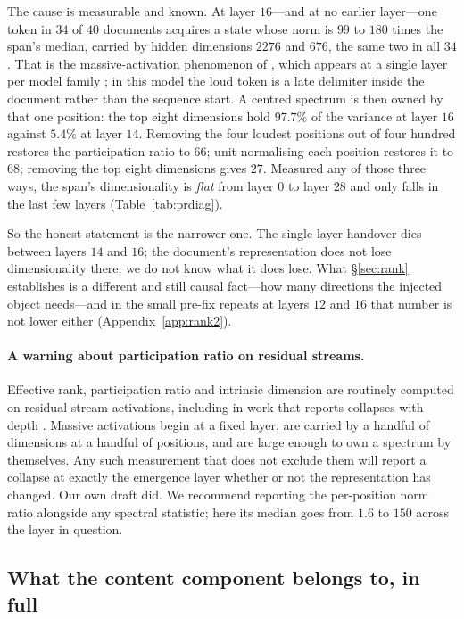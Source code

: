 \documentclass{article}
\begin{document}
The cause is measurable and known. At layer $16$---and at no earlier layer---one
token in $34$ of $40$ documents acquires a state whose norm is $99$ to $180$ times the
span's median, carried by hidden dimensions $2276$ and $676$, the same two in
all $34$. That is the massive-activation phenomenon of
\citet{sun2024massive}, which appears at a single layer per model family
\citep{shi2026melayer}; in this model the loud token is a late delimiter inside
the document rather than the sequence start. A centred spectrum is then owned by
that one position: the top eight dimensions hold $97.7\%$ of the variance at
layer $16$ against $5.4\%$ at layer $14$. Removing the four loudest positions
out of four hundred restores the participation ratio to $66$; unit-normalising
each position restores it to $68$; removing the top eight dimensions gives $27$.
Measured any of those three ways, the span's dimensionality is
\emph{flat} from layer $0$ to layer $28$ and only falls in the last few layers
(Table~\ref{tab:prdiag}).

So the honest statement is the narrower one. The single-layer handover dies
between layers $14$ and $16$; the document's representation does not lose
dimensionality there; we do not know what it does lose. What \S\ref{sec:rank}
establishes is a different and still causal fact---how many directions the
injected object needs---and in the small pre-fix repeats at layers $12$ and
$16$ that number is not lower either (Appendix~\ref{app:rank2}).



\paragraph{A warning about participation ratio on residual streams.} Effective
rank, participation ratio and intrinsic dimension are routinely computed on
residual-stream activations, including in work that reports collapses with depth
\citep{fernando2026residualspectral, sarkar2026causaldim}. Massive activations
begin at a fixed layer, are carried by a handful of dimensions at a handful of
positions, and are large enough to own a spectrum by themselves. Any such
measurement that does not exclude them will report a collapse at exactly the
emergence layer whether or not the representation has changed. Our own draft did.
We recommend reporting the per-position norm ratio alongside any spectral
statistic; here its median goes from $1.6$ to $150$ across the layer in question.

\subsection{What the content component belongs to, in full}
\label{app:whose}
\label{app:belongs}
\end{document}
